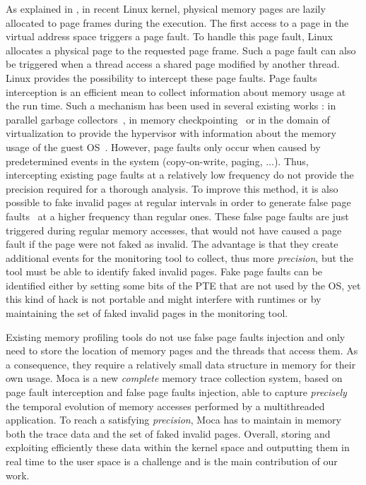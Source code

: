 As explained in , in recent Linux kernel, physical memory pages are lazily allocated to page frames during the execution.
The first access to a page in the virtual address space triggers a page fault.
To handle this page fault, Linux allocates a physical page to the requested page frame.
Such a page fault can also be triggered when a thread access a shared page modified by another thread.
\gls{Linux} provides the possibility to intercept these page faults.
Page faults interception is an efficient mean to collect information about memory usage at the run time.
Such a mechanism has been used in several existing works : in parallel garbage collectors~\cite{Boehm91Mostly}, in memory checkpointing~\cite{Heo05Spaceefficient} or in the domain of virtualization to provide the hypervisor with information about the memory usage of the guest \gls{OS}~\cite{Jones06Geiger}.
However, page faults only occur when caused by predetermined events in the system (copy-on-write, paging, ...).
Thus, intercepting existing page faults at a relatively low frequency do not provide the precision required for a thorough analysis.
To improve this method, it is also possible to fake invalid pages at regular intervals in order to generate false page faults~\cite{Bae12Dynamic,Diener13CommunicationBased} at a higher frequency than regular ones.
These false page faults are just triggered during regular memory accesses, that would not have caused a page fault if the page were not faked as invalid.
The advantage is that they create additional events for the monitoring tool to collect, thus more \emph{precision}, but the tool must be able to identify faked invalid pages.
Fake page faults can be identified either by setting some bits of the \gls{PTE} that are not used by the \gls{OS}, yet this kind of hack is not portable and might interfere with runtimes or by maintaining the set of faked invalid pages in the monitoring tool.

Existing memory profiling tools do not use false page faults injection and only need to store the location of memory pages and the threads that access them.
As a consequence, they require a relatively small data structure in memory for their own usage.
\gls{Moca} is a new \emph{complete} memory trace collection system, based on page fault interception and false page faults injection, able to capture \emph{precisely} the temporal evolution of memory accesses performed by a multithreaded application.
To reach a satisfying \emph{precision}, \gls{Moca} has to maintain in memory both the trace data and the set of faked invalid pages.
Overall, storing and exploiting efficiently these data within the kernel space and outputting them in real time to the user space is a challenge and is the main contribution of our work.

